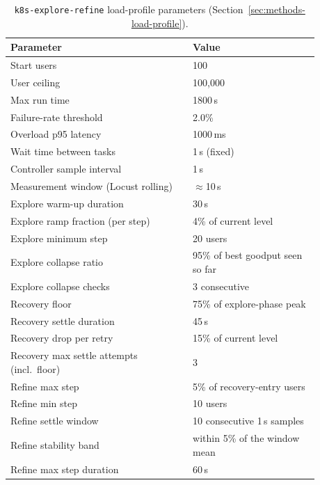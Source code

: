 \begin{table}[htbp]
  \centering
  \caption{\texttt{k8s-explore-refine} load-profile parameters
    (Section~\ref{sec:methods-load-profile}).}
  \label{tab:appendix-load-profile}
  \small
  \begin{tabular}{@{}p{0.52\linewidth}p{0.36\linewidth}@{}}
    \toprule
    \textbf{Parameter} & \textbf{Value} \\
    \midrule
    Start users & 100 \\
    User ceiling & 100{,}000 \\
    Max run time & 1800\,s \\
    Failure-rate threshold & 2.0\% \\
    Overload p95 latency & 1000\,ms \\
    Wait time between tasks & 1\,s (fixed) \\
    Controller sample interval & 1\,s \\
    Measurement window (Locust rolling) & $\approx$10\,s \\
    \addlinespace
    Explore warm-up duration & 30\,s \\
    Explore ramp fraction (per step) & 4\% of current level \\
    Explore minimum step & 20 users \\
    Explore collapse ratio & 95\% of best goodput seen so far \\
    Explore collapse checks & 3 consecutive \\
    \addlinespace
    Recovery floor & 75\% of explore-phase peak \\
    Recovery settle duration & 45\,s \\
    Recovery drop per retry & 15\% of current level \\
    Recovery max settle attempts (incl.\ floor) & 3 \\
    \addlinespace
    Refine max step & 5\% of recovery-entry users \\
    Refine min step & 10 users \\
    Refine settle window & 10 consecutive 1\,s samples \\
    Refine stability band & within 5\% of the window mean \\
    Refine max step duration & 60\,s \\
    \bottomrule
  \end{tabular}
\end{table}

